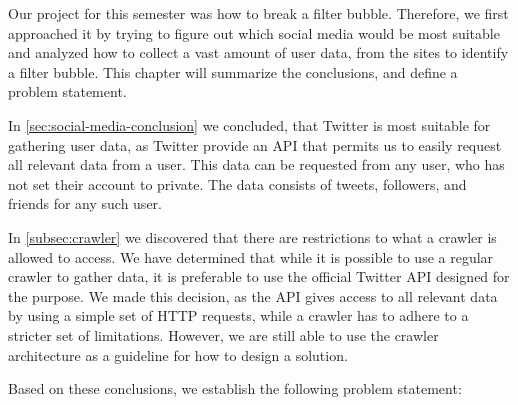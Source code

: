 Our project for this semester was how to break a filter bubble. Therefore, we
first approached it by trying to figure out which social media would be most
suitable and analyzed how to collect a vast amount of user data, from the sites
to identify a filter bubble.
This chapter will summarize the conclusions, and define a problem
statement.\nl

In \autoref{sec:social-media-conclusion} we concluded, that Twitter is most suitable
for gathering user data, as Twitter provide an \ac{API} that permits us to
easily request all relevant data from a user. This data can be requested from
any user, who has not set their account to private. The data consists of tweets,
followers, and friends for any such user.\nl

In \autoref{subsec:crawler} we discovered that there are restrictions to what
a crawler is allowed to access. We have determined that while it is possible to
use a regular crawler to gather data, it is preferable to use the official
Twitter \ac{API} designed for the purpose. We made this decision, as the
\ac{API} gives access to all relevant data by using a simple set of \ac{HTTP}
requests, while a crawler has to adhere to a stricter set of limitations.
However, we are still able to use the crawler architecture as a guideline for
how to design a solution.\nl


Based on these conclusions, we establish the following problem statement:

\begin{center}
\begin{minipage}{0.95\linewidth} 


\end{minipage}
\end{center}




